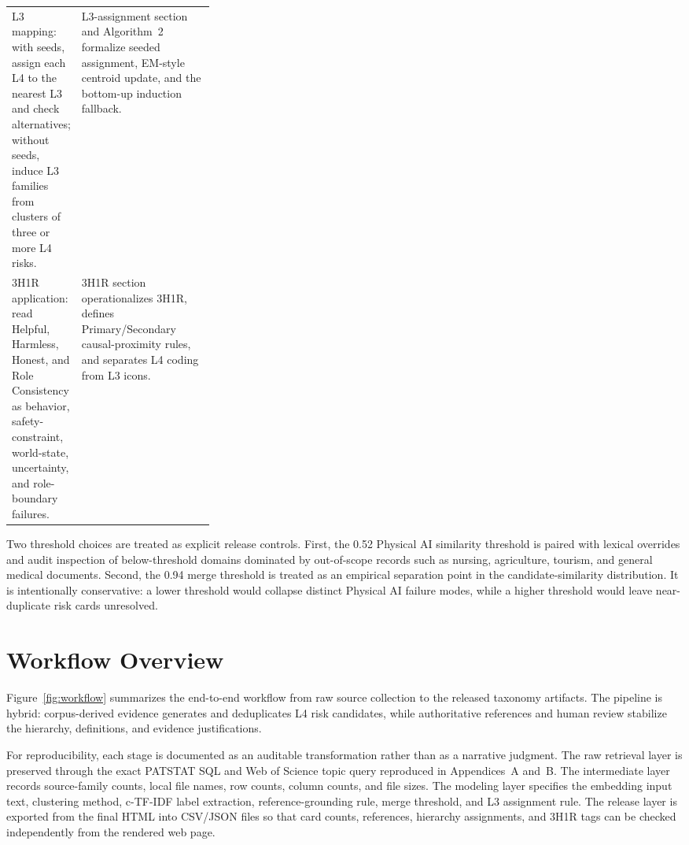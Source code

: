 \documentclass[11pt]{article}
\begin{document}
\begin{table}[htbp]
\begin{tabularx}{\linewidth}{p{0.30\linewidth}X}
L3 mapping: with seeds, assign each L4 to the nearest L3 and check alternatives; without seeds, induce L3 families from clusters of three or more L4 risks. & L3-assignment section and Algorithm~2 formalize seeded assignment, EM-style centroid update, and the bottom-up induction fallback. \\
3H1R application: read Helpful, Harmless, Honest, and Role Consistency as behavior, safety-constraint, world-state, uncertainty, and role-boundary failures. & 3H1R section operationalizes 3H1R, defines Primary/Secondary causal-proximity rules, and separates L4 coding from L3 icons. \\
\bottomrule
\end{tabularx}
\end{table}

Two threshold choices are treated as explicit release controls. First, the 0.52 Physical AI similarity threshold is paired with lexical overrides and audit inspection of below-threshold domains dominated by out-of-scope records such as nursing, agriculture, tourism, and general medical documents. Second, the 0.94 merge threshold is treated as an empirical separation point in the candidate-similarity distribution. It is intentionally conservative: a lower threshold would collapse distinct Physical AI failure modes, while a higher threshold would leave near-duplicate risk cards unresolved.

\section{Workflow Overview}

Figure~\ref{fig:workflow} summarizes the end-to-end workflow from raw source collection to the released taxonomy artifacts. The pipeline is hybrid: corpus-derived evidence generates and deduplicates L4 risk candidates, while authoritative references and human review stabilize the hierarchy, definitions, and evidence justifications.

For reproducibility, each stage is documented as an auditable transformation rather than as a narrative judgment. The raw retrieval layer is preserved through the exact PATSTAT SQL and Web of Science topic query reproduced in Appendices~A and~B. The intermediate layer records source-family counts, local file names, row counts, column counts, and file sizes. The modeling layer specifies the embedding input text, clustering method, c-TF-IDF label extraction, reference-grounding rule, merge threshold, and L3 assignment rule. The release layer is exported from the final HTML into CSV/JSON files so that card counts, references, hierarchy assignments, and 3H1R tags can be checked independently from the rendered web page.
\end{document}
